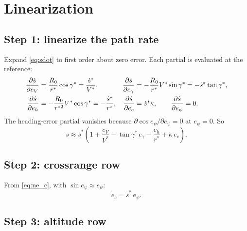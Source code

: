\documentclass[11pt]{report}
\numberwithin{equation}{chapter}
\newcommand{\pd}[2]{\frac{\partial #1}{\partial #2}}
\newcommand{\sdot}{\dot s}
\begin{document}
\section{Linearization}

\subsection*{Step 1: linearize the path rate}

Expand \cref{eq:sdot} to first order about zero error. Each partial is evaluated at the
reference:
\begin{align}
  \pd{\sdot}{e_V} &= \frac{R_0}{r^*}\cos\gamma^* = \frac{\sdot^*}{V^*}, &
  \pd{\sdot}{e_\gamma} &= -\frac{R_0}{r^*}V^*\sin\gamma^* = -\sdot^*\tan\gamma^*, \notag\\
  \pd{\sdot}{e_h} &= -\frac{R_0}{r^{*2}}V^*\cos\gamma^* = -\frac{\sdot^*}{r^*}, &
  \pd{\sdot}{e_c} &= \sdot^*\kappa, \qquad
  \pd{\sdot}{e_\psi} = 0 . \notag
\end{align}
The heading-error partial vanishes because $\partial\cos e_\psi/\partial e_\psi = 0$ at
$e_\psi=0$. So
\begin{equation}
  \sdot \approx \sdot^*\left(1 + \frac{e_V}{V^*} - \tan\gamma^*\,e_\gamma - \frac{e_h}{r^*} + \kappa\,e_c\right).
  \label{eq:sdot_lin}
\end{equation}

\subsection*{Step 2: crossrange row}

From \cref{eq:ne_c}, with $\sin e_\psi\approx e_\psi$:
\begin{equation}
  \dot e_c = \sdot^*\,e_\psi .
\end{equation}

\subsection*{Step 3: altitude row}
\end{document}
